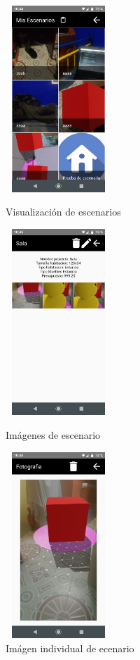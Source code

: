 \begin{figure}[hbt!]
	\begin{minipage}{0.32\textwidth}
		\centering
		\includegraphics[width=4cm,height=7cm]{imagenes/desarrollo/app/scenarios.png}
		\caption{Visualización de escenarios}
		\label{fig:readscenarios}
	\end{minipage}\hfill
	\begin{minipage}{0.32\textwidth}
		\centering
		\includegraphics[width=4cm,height=7cm]{imagenes/desarrollo/app/scenarios_img.png}
		\caption{Imágenes de escenario}
		\label{fig:scenarioimgs}
	\end{minipage}\hfill
	\begin{minipage}{0.32\textwidth}
		\centering
		\includegraphics[width=4cm,height=7cm]{imagenes/desarrollo/app/scenario_pic.png}
		\caption{Imágen individual de ecenario}
		\label{fig:scimg}
	\end{minipage}\hfill
\end{figure}

